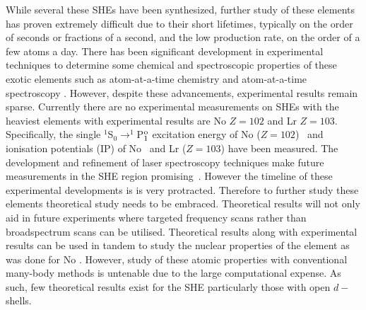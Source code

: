 \documentclass[10pt,a4paper, twoside, openright]{report}
\begin{document}
While several these SHEs have been synthesized, further study of these elements has proven extremely difficult due to their short lifetimes, typically on the order of seconds or fractions of a second, and the low production rate, on the order of a few atoms a day\cite{Dullmann2017}. There has been significant development in experimental techniques to determine some chemical and spectroscopic properties of these exotic elements such as atom-at-a-time chemistry \cite{Dullmann2017, Nagame2015, Turler2013} and atom-at-a-time spectroscopy \cite{Backe2015}. However, despite these advancements, experimental results remain sparse. Currently there are no experimental measurements on SHEs with the heaviest elements with experimental results are No $Z=102$ and Lr $Z=103$. Specifically, the single $^1$S$_0 \rightarrow ^1$P$^{\rm o}_1$ excitation energy of No  ($Z=102$)~\cite{Laatiaoui2016, Chhetri2018} and ionisation potentials (IP) of No~\cite{Laatiaoui2016} and Lr ($Z=103$) \cite{SAB15} have been measured. The development and refinement of laser spectroscopy techniques make future measurements in the SHE region promising~\cite{Laatiaoui2014, Laatiaoui20161, Ferrer2017}. However the timeline of these experimental developments is is very protracted. Therefore to further study these elements theoretical study needs to be embraced. Theoretical results will not only aid in future experiments where targeted frequency scans rather than broadspectrum scans can be utilised. Theoretical results along with experimental results can be used in tandem to study the nuclear properties of the element as was done for No \cite{Borchevsky2007, Laatiaoui2016}. However, study of these atomic properties with conventional many-body methods is untenable due to the large computational expense. As such, few theoretical results exist for the SHE particularly those with open $d-$shells.\\
\linebreak
\end{document}
